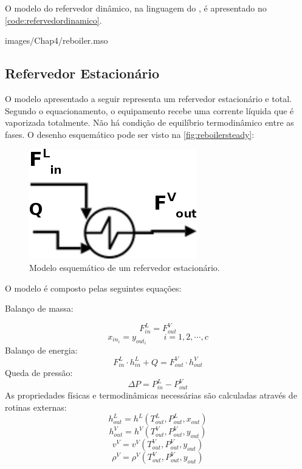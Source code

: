 O modelo do refervedor dinâmico, na linguagem do \emso, é apresentado no
\autoref{code:refervedordinamico}.

 {images/Chap4/reboiler.mso}

\subsection{Refervedor Estacionário} \label{sec:modelorefervedorestacionario}
O modelo apresentado a seguir representa um refervedor estacionário e total. Segundo o equacionamento, o equipamento
recebe uma corrente líquida que é vaporizada totalmente. Não há condição de equilíbrio termodinâmico entre as fases. O
desenho esquemático pode ser visto na \autoref{fig:reboilersteady}:
\begin{figure}[htb]
\centering \includegraphics[scale=0.5]{images/Chap3/esquemareboilersteady2.png}
\caption{Modelo esquemático de um refervedor estacionário.}
\label{fig:reboilersteady}
\end{figure}

O modelo é composto pelas seguintes equações:

\begin{flushleft}
Balanço de massa:
\end{flushleft}
\begin{equation}
F_{in}^L = F_{out}^V
\end{equation}
\begin{equation}
x_{in_i} = y_{out_i} \qquad i=1,2,\cdots,c
\end{equation}
Balanço de energia:
\begin{equation}
F_{in}^L \cdot h_{in}^L + Q= F_{out}^V \cdot h_{out}^V 
\end{equation}
Queda de pressão:
\begin{equation}
\Delta P = P_{in}^L - P_{out}^V
\end{equation}
As propriedades físicas e termodinâmicas necessárias são calculadas através de rotinas externas:
\begin{equation}
h_{out}^L = h^L(T_{out}^L, P_{out}^L, x_{out})
\end{equation}
\begin{equation}
h_{out}^V = h^V(T_{out}^V, P_{out}^V, y_{out})
\end{equation}
\begin{equation}
v^V = v^V(T_{out}^V, P_{out}^V, y_{out})
\end{equation}
\begin{equation}
\rho^V = \rho^V(T_{out}^V, P_{out}^V, y_{out})
\end{equation}


